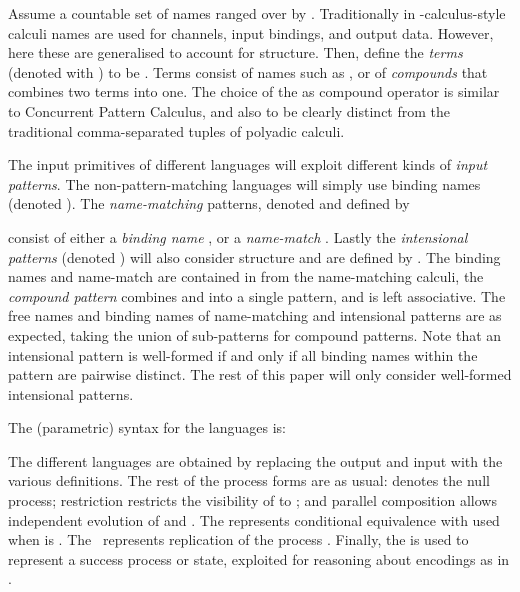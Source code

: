 \documentclass[submission,copyright,creativecommons]{eptcs}
\begin{document}
Assume a countable set of names  ranged over by . Traditionally in 
-calculus-style calculi names are used for channels, input bindings, and output data. However, here these are generalised to account for structure. Then, define the {\em terms} (denoted with ) to be
.
Terms consist of names such as , or of {\em compounds}  that combines two terms into one.
The choice of the  as compound operator is similar to Concurrent Pattern Calculus, and also to be clearly distinct from the traditional comma-separated tuples of polyadic calculi.

The input primitives of different languages will exploit different kinds of {\em input patterns}.
The non-pattern-matching languages will simply use binding names (denoted ).
The {\em name-matching} patterns, denoted  and defined by

consist of either a {\em binding name} , or a {\em name-match} .
Lastly the {\em intensional patterns} (denoted ) will also consider structure and are defined by
.
The binding names  and name-match  are contained in  from the name-matching calculi,
the {\em compound pattern}  combines  and  into a single pattern, and is left associative.
The free names and binding names of name-matching and intensional patterns are as expected, taking
the union of sub-patterns for compound patterns. Note that an intensional pattern is well-formed
if and only if all binding names within the pattern are pairwise distinct.
The rest of this paper will only consider well-formed intensional patterns.

The (parametric) syntax for the languages is:

The different languages are obtained by replacing the output  and input  with the various definitions.
The rest of the process forms are as usual:
 denotes the null process;
restriction  restricts the visibility of  to ;
and parallel composition  allows independent evolution of  and .
The  represents conditional equivalence with  used when  is .
The~ represents replication of the process .
Finally, the  is used to represent a success process or state, exploited for reasoning about
encodings as in \cite{G:CONCUR08,GivenWilsonPHD}.
\end{document}
